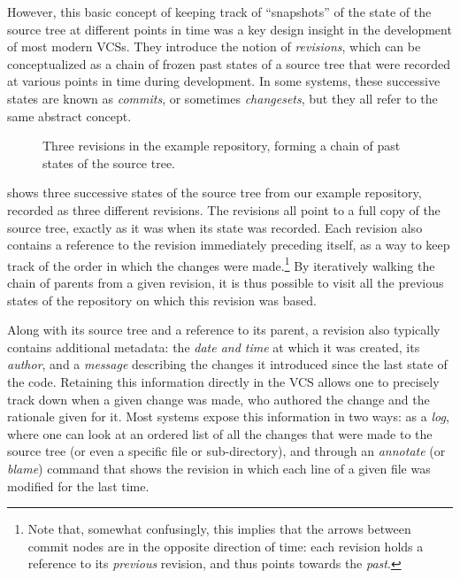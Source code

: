 However, this basic concept of keeping track of ``snapshots'' of the state of the
source tree at different points in time was a key design insight in the
development of most modern \glspl{VCS}. They introduce the notion of
\emph{revisions}, which can be conceptualized as a chain of frozen past states
of a source tree that were recorded at various points in time during
development. In some systems, these successive states are known as
\emph{commits}, or sometimes \emph{changesets}, but they all refer to the same
abstract concept.

\begin{figure}
    \centering
    
    \caption{Three revisions in the example repository, forming a chain of
    past states of the source tree.}%
    \label{fig:vcs-rev-chain-example}
\end{figure}

 shows three successive states of the source
tree from our example repository, recorded as three different revisions. The
revisions all point to a full copy of the source tree, exactly as it was when its
state was recorded. Each revision also contains a reference to the revision
immediately preceding itself, as a way to keep track of the order in which the
changes were made.\footnote{Note that, somewhat confusingly, this implies that
the arrows between commit nodes are in the opposite direction of time: each
revision holds a reference to its \emph{previous} revision, and thus points
towards the \emph{past}.} By iteratively walking the chain of parents from a
given revision, it is thus possible to visit all the previous states of the
repository on which this revision was based.

Along with its source tree and a reference to its parent, a revision also
typically contains additional metadata: the \emph{date and time} at which it
was created, its \emph{author}, and a \emph{message} describing the changes it
introduced since the last state of the code. Retaining this information
directly in the \gls{VCS} allows one to precisely track down when a given
change was made, who authored the change and the rationale given for it. Most
systems expose this information in two ways: as a \emph{log}, where one can
look at an ordered list of all the changes that were made to the source tree
(or even a specific file or sub-directory), and through an \emph{annotate} (or
\emph{blame}) command that shows the revision in which each line of a given
file was modified for the last time.

